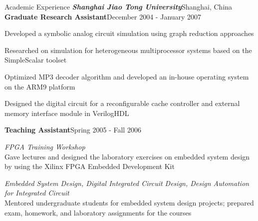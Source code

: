 \documentclass{resume} %
\begin{document}
\begin{rSection}{Academic Experience}
{\large
\emph{\textbf{Shanghai Jiao Tong University}}\hfill{Shanghai, China}\\
}
\textbf{Graduate Research Assistant}\hfill{December 2004 - January 2007} 
\begin{itemize}
{\small
\item   Developed a symbolic analog circuit simulation using graph reduction approaches
\vspace{-0.5em} 
\item   Researched on simulation for heterogeneous multiprocessor systems based on the SimpleScalar toolset
\vspace{-0.5em} 
\item   Optimized MP3 decoder algorithm and developed an in-house operating system on the ARM9 platform
\vspace{-0.5em} 
\item   Designed the digital circuit for a reconfigurable cache controller and external memory interface module in VerilogHDL
}
\end{itemize}

\textbf{Teaching Assistant}\hfill{Spring 2005 - Fall 2006}
\begin{itemize}
{\small
\item  \textit{FPGA Training Workshop} \\
Gave lectures and designed the laboratory exercises on embedded system design by using the Xilinx FPGA Embedded Development Kit

\item  \textit{Embedded System Design, Digital Integrated Circuit Design, Design Automation for Integrated Circuit} \\
Mentored undergraduate students for embedded system design projects; prepared exam, homework, and laboratory assignments for the courses
}
\end{itemize}

\end{rSection}
\end{document}
